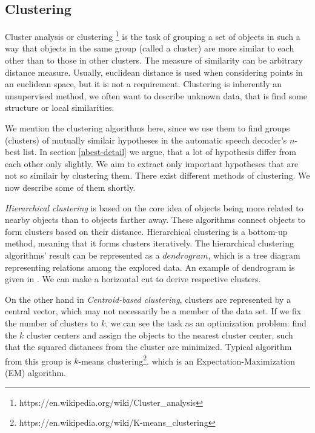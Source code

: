 \subsection{Clustering}
Cluster analysis or clustering \footnote{https://en.wikipedia.org/wiki/Cluster\_analysis} is the task of grouping a set of objects in such a way that objects in the same group (called a cluster) are more similar to each other than to those in other clusters.
The measure of similarity can be arbitrary distance measure.
Usually, euclidean distance is used when considering points in an euclidean space, but it is not a requirement.
Clustering is inherently an unsupervised method, we often want to describe unknown data, that is find some structure or local similarities.
\par
We mention the clustering algorithms here, since we use them to find groups (clusters) of mutually similair hypotheses in the automatic speech decoder's $n$-best list.
In section \ref{nbest-detail} we argue, that a lot of hypothesis differ from each other only slightly.
We aim to extract only important hypotheses that are not so similair by clustering them.
There exist different methods of clustering.
We now describe some of them shortly.
\par
\textit{Hierarchical clustering} is based on the core idea of objects being more related to nearby objects than to objects farther away.
These algorithms connect objects to form clusters based on their distance.
Hierarchical clustering is a bottom-up method, meaning that it forms clusters iteratively.
The hierarchical clustering algorithms' result can be represented as a $dendrogram$, which is a tree diagram representing relations among the explored data.
An example of dendrogram is given in .
We can make a horizontal cut to derive respective clusters.
\par
On the other hand in \textit{Centroid-based clustering}, clusters are represented by a central vector, which may not necessarily be a member of the data set.
If we fix the number of clusters to $k$, we can see the task as an optimization problem: find the $k$ cluster centers and assign the objects to the nearest cluster center, such that the squared distances from the cluster are minimized.
Typical algorithm from this group is $k$-means clustering\footnote{https://en.wikipedia.org/wiki/K-means\_clustering}. which is an Expectation-Maximization (EM) algorithm.
\par
